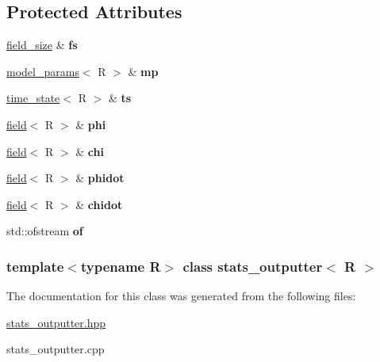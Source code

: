 \subsection*{Protected Attributes}
\begin{DoxyCompactItemize}
\item 
\hypertarget{classstats__outputter_af1df1f462b7fa0b4ddf88ba3a610a5ad}{
\hyperlink{structfield__size}{field\_\-size} \& {\bfseries fs}}
\label{classstats__outputter_af1df1f462b7fa0b4ddf88ba3a610a5ad}

\item 
\hypertarget{classstats__outputter_a57040b1bf054e48394617dfb264c14d6}{
\hyperlink{structmodel__params}{model\_\-params}$<$ R $>$ \& {\bfseries mp}}
\label{classstats__outputter_a57040b1bf054e48394617dfb264c14d6}

\item 
\hypertarget{classstats__outputter_a0521e1c35bb5acadb4ce78c6b5636122}{
\hyperlink{structtime__state}{time\_\-state}$<$ R $>$ \& {\bfseries ts}}
\label{classstats__outputter_a0521e1c35bb5acadb4ce78c6b5636122}

\item 
\hypertarget{classstats__outputter_a0f99351a3034982104841cb09e7564da}{
\hyperlink{classfield}{field}$<$ R $>$ \& {\bfseries phi}}
\label{classstats__outputter_a0f99351a3034982104841cb09e7564da}

\item 
\hypertarget{classstats__outputter_a682704aa2c6cc2f8be5365bc5feabafe}{
\hyperlink{classfield}{field}$<$ R $>$ \& {\bfseries chi}}
\label{classstats__outputter_a682704aa2c6cc2f8be5365bc5feabafe}

\item 
\hypertarget{classstats__outputter_aa0cbe6f9d6e3dadba3e8dc7bd0714ea4}{
\hyperlink{classfield}{field}$<$ R $>$ \& {\bfseries phidot}}
\label{classstats__outputter_aa0cbe6f9d6e3dadba3e8dc7bd0714ea4}

\item 
\hypertarget{classstats__outputter_a6f01b31c2ba0872a70cbd7b1734417e4}{
\hyperlink{classfield}{field}$<$ R $>$ \& {\bfseries chidot}}
\label{classstats__outputter_a6f01b31c2ba0872a70cbd7b1734417e4}

\item 
\hypertarget{classstats__outputter_a918c79e8ec6dbcffee8d10ac5a79db41}{
std::ofstream {\bfseries of}}
\label{classstats__outputter_a918c79e8ec6dbcffee8d10ac5a79db41}

\end{DoxyCompactItemize}
\subsubsection*{template$<$typename R$>$ class stats\_\-outputter$<$ R $>$}



The documentation for this class was generated from the following files:\begin{DoxyCompactItemize}
\item 
\hyperlink{stats__outputter_8hpp}{stats\_\-outputter.hpp}\item 
stats\_\-outputter.cpp\end{DoxyCompactItemize}

